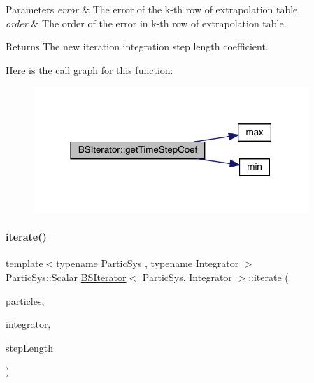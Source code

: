 \begin{DoxyParams}{Parameters}
{\em error} & The error of the k-\/th row of extrapolation table. \\
\hline
{\em order} & The order of the error in k-\/th row of extrapolation table. \\
\hline
\end{DoxyParams}
\begin{DoxyReturn}{Returns}
The new iteration integration step length coefficient. 
\end{DoxyReturn}
Here is the call graph for this function\+:\nopagebreak
\begin{figure}[H]
\begin{center}
\leavevmode
\includegraphics[width=295pt]{class_b_s_iterator_a9d06a0d0c9e458ea96952b0514adece9_cgraph}
\end{center}
\end{figure}
\mbox{\label{class_b_s_iterator_a5520642ecbd454fb1f4d9ece18dc4e3f}} 
\paragraph{\texorpdfstring{iterate()}{iterate()}}
{\footnotesize\ttfamily template$<$typename Partic\+Sys , typename Integrator $>$ \\
Partic\+Sys\+::\+Scalar \mbox{\hyperlink{class_b_s_iterator}{B\+S\+Iterator}}$<$ Partic\+Sys, Integrator $>$\+::iterate (\begin{DoxyParamCaption}\item[{Partic\+Sys \&}]{particles,  }\item[{Integrator \&}]{integrator,  }\item[{\mbox{\hyperlink{class_b_s_iterator_a7857f8ff9032955ea4dcc22cd18ca7a1}{Scalar}}}]{step\+Length }\end{DoxyParamCaption})}



